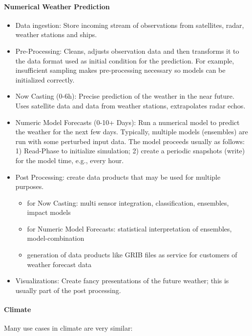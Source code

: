 \paragraph{Numerical Weather Prediction}

\begin{itemize}
	\item Data ingestion: Store incoming stream of observations from satellites, radar, weather stations and ships.
	\item Pre-Processing: Cleans, adjusts observation data and then transforms it to the data format used as initial condition for the prediction. For example, insufficient sampling makes pre-processing necessary so models can be initialized correctly.
	\item Now Casting (0-6h): Precise prediction of the weather in the near future.
	Uses satellite data and data from weather stations, extrapolates radar echos.
	\item Numeric Model Forecasts (0-10+ Days): Run a numerical model to predict the weather for the next few days.
	Typically, multiple models (ensembles) are run with some perturbed input data.
	The model proceeds usually as follows: 1) Read-Phase to initialize simulation; 2) create a periodic snapshots (write) for the model time, e.g., every hour.
	\item  Post Processing: create data products that may be used for multiple purposes.
	\begin{itemize}
		\item for Now Casting: multi sensor integration, classification, ensembles, impact models
		\item for Numeric Model Forecasts: statistical interpretation of ensembles, model-combination
		\item generation of data products like GRIB files as service for customers of weather forecast data
	\end{itemize}
	\item Visualizations: Create fancy presentations of the future weather; this is usually part of the post processing.
\end{itemize}


\paragraph{Climate}

Many use cases in climate are very similar:

